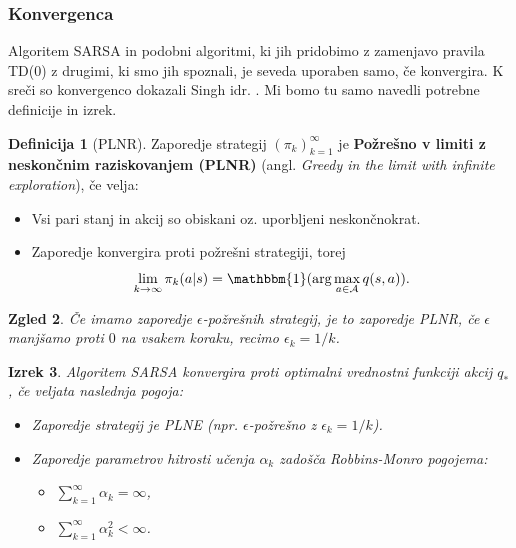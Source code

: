 \documentclass[12pt,a4paper]{amsart}
\theoremstyle{definition} %
\newtheorem{definicija}{Definicija}[section]
\theoremstyle{plain} %
\newtheorem{izrek}[definicija]{Izrek}
\newtheorem{zgled}[definicija]{Zgled}
\begin{document}
\subsubsection{Konvergenca}
Algoritem SARSA in podobni algoritmi, ki jih pridobimo z zamenjavo pravila TD($0$) z drugimi, ki smo 
jih spoznali, je seveda uporaben samo, če konvergira. K sreči so konvergenco dokazali Singh idr. 
\cite{dokaz}. Mi bomo tu samo navedli potrebne definicije in izrek.

\begin{definicija}[PLNR]
    Zaporedje strategij $(\pi_k)_{k=1}^\infty$ je \textbf{Požrešno v limiti z neskončnim raziskovanjem 
    (PLNR)} (angl. \textit{Greedy in the limit with infinite exploration}), če velja:
    \begin{itemize}
        \item Vsi pari stanj in akcij so obiskani oz. uporbljeni neskončnokrat.
        \item Zaporedje konvergira proti požrešni strategiji, torej 
            $$
            \lim_{k \rightarrow \infty} \pi_k(a|s) = \mathbbm{1} (\text{arg}\max_{a \in \mathcal{A}} 
                q(s, a)).
            $$
    \end{itemize}
\end{definicija}

\begin{zgled}
    Če imamo zaporedje $\epsilon$-požrešnih strategij, je to zaporedje PLNR, če $\epsilon$ manjšamo 
    proti $0$ na vsakem koraku, recimo $\epsilon_k = 1 / k$.
\end{zgled}

\begin{izrek}
    Algoritem SARSA konvergira proti optimalni vrednostni funkciji akcij $q_*$, če veljata naslednja 
    pogoja:
    \begin{itemize}
        \item Zaporedje strategij je PLNE (npr. $\epsilon$-požrešno z $\epsilon_k = 1 / k$).
        \item Zaporedje parametrov hitrosti učenja $\alpha_k$ zadošča \textit{Robbins-Monro} pogojema:
            \begin{itemize}
                \item $\sum_{k=1}^\infty \alpha_k = \infty$,
                \item $\sum_{k=1}^\infty \alpha_k^2 < \infty$.
            \end{itemize}
    \end{itemize}
\end{izrek}
\end{document}
